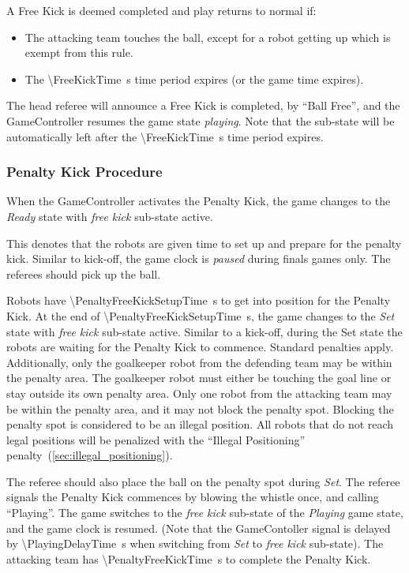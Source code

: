 A Free Kick is deemed completed and play returns to normal if:
\begin{itemize}
    \item The attacking team touches the ball, except for a robot getting up which is exempt from this rule.
    \item The \qty{\FreeKickTime}{\second} time period expires (or the game time expires).
\end{itemize}
The head referee will announce a Free Kick is completed, by ``Ball Free'', and the GameController resumes the game state \emph{playing}. Note that the sub-state will be automatically left after the \qty{\FreeKickTime}{\second} time period expires.

\subsubsection{Penalty Kick Procedure}
\label{sec:penalty_free_kick}

When the GameController activates the Penalty Kick, the game changes to the \textit{Ready} state with \textit{free kick} sub-state active.

This denotes that the robots are given time to set up and prepare for the penalty kick.
Similar to kick-off, the game clock is \textit{paused} during finals games only.
The referees should pick up the ball.

Robots have \qty{\PenaltyFreeKickSetupTime}{\second} to get into position for the Penalty Kick. At the end of \qty{\PenaltyFreeKickSetupTime}{\second}, the game changes to the \textit{Set} state with \textit{free kick} sub-state active.
Similar to a kick-off, during the Set state the robots are waiting for the Penalty Kick to commence.
Standard penalties apply.
Additionally, only the goalkeeper robot from the defending team may be within the penalty area. The goalkeeper robot must either be touching the goal line or stay outside its own penalty area.
Only one robot from the attacking team may be within the penalty area, and it may not block the penalty spot.
Blocking the penalty spot is considered to be an illegal position.
All robots that do not reach legal positions will be penalized with the ``Illegal Positioning'' penalty~(\cf \cref{sec:illegal_positioning}).

The referee should also place the ball on the penalty spot during \textit{Set}.
The referee signals the Penalty Kick commences by blowing the whistle once, and calling ``Playing''.
The game switches to the \textit{free kick} sub-state of the \textit{Playing} game state, and the game clock is resumed.
(Note that the GameContoller signal is delayed by \qty{\PlayingDelayTime}{\second} when switching from \textit{Set} to \textit{free kick} sub-state).
The attacking team has \qty{\PenaltyFreeKickTime}{\second} to complete the Penalty Kick.

